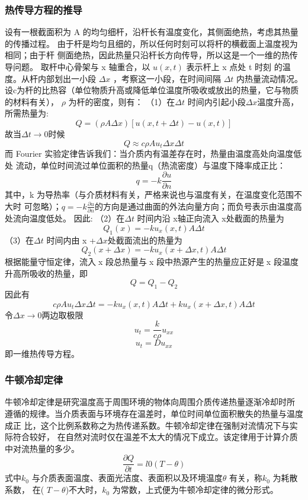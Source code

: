 \documentclass{article}
\begin{document}
	\subsubsection{热传导方程的推导}
	设有一根截面积为 A 的均匀细杆，沿杆长有温度变化，其侧面绝热，考虑其热量
	的传播过程。
	由于杆是均匀且细的，所以任何时刻可以将杆的横截面上温度视为相同；由于杆
	侧面绝热，因此热量只沿杆长方向传导，所以这是一个一维的热传导问题。
	取杆中心骨架与 x 轴重合，以 $u ( x , t )$ 表示杆上 x 点处 t 时刻
	的温度。从杆内部划出一小段 $\varDelta  x$ ，考察这一小段，在时间间隔 $\varDelta t$ 内热量流动情况。
	设c为杆的比热容（单位物质升高或降低单位温度所吸收或放出的热量，它与物质
	的材料有关）， $\rho $ 为杆的密度，则有：
	（1）在$\varDelta t$ 时间内引起小段$\varDelta x$温度升高，所需热量为:
	$$ Q = (\rho A\varDelta x)[u(x,t+\varDelta t)-u(x,t)]$$
	故当$\varDelta t \rightarrow 0$时候$$Q \approx c\rho Au_{t}\varDelta x\varDelta t$$
	而 Fourier 实验定律告诉我们：当介质内有温差存在时，热量由温度高处向温度低处
	流动，单位时间流过单位面积的热量q（热流密度）与温度下降率成正比：$$q = -k\frac{\partial u}{\partial n} $$
	其中，k 为导热率（与介质材料有关，严格来说也与温度有关，在温度变化范围不大时
	可忽略）；$q = -k\frac{\partial u}{\partial n} $的方向是通过曲面的外法向量方向；而负号表示由温度高处流向温度低处。
	因此:
	（2）在$\varDelta t$ 时间内沿 x轴正向流入 x处截面的热量为$$Q_{1}(x)=-ku_{x}(x,t)A\varDelta t$$
	（3）在$\varDelta t$ 时间内由 x +$\varDelta x$处截面流出的热量为$$Q_{2}(x+\varDelta x)=-ku_{x}(x+\varDelta x,t)A\varDelta t$$
	根据能量守恒定律，流入x 段总热量与x 段中热源产生的热量应正好是x 段温度
	升高所吸收的热量，即$$Q = Q_{1}-Q_{2}$$
	因此有$$c\rho Au_{t}\varDelta x\varDelta t = -ku_{x}(x,t)A\varDelta t+ku_{x}(x+\varDelta x,t)A\varDelta t$$
	令$\varDelta x \rightarrow 0$两边取极限$$u_{t} = \frac{k}{c\rho } u_{xx}$$
	$$u_{t} = Du_{xx}$$即一维热传导方程。
	\subsubsection{牛顿冷却定律}
	牛顿冷却定律是研究温度高于周围环境的物体向周围介质传递热量逐渐冷却时所
	遵循的规律。当介质表面与环境存在温差时，单位时间单位面积散失的热量与温度成正
	比，这个比例系数称之为热传递系数。牛顿冷却定律在强制对流情况下与实际符合较好，
	在自然对流时仅在温差不太大的情况下成立。该定律用于计算介质中对流热量的多少。
	$$\frac{\partial Q}{\partial t}  = l{0}(T-\theta )$$
	式中$k_{0}$ 与介质表面温度、表面光洁度、表面积以及环境温度$\theta $ 有关，称$k_{0}$ 为耗散系数，
	在( $T-\theta $)不大时，$k_{0}$ 为常数，上式便为牛顿冷却定律的微分形式。
\end{document}

